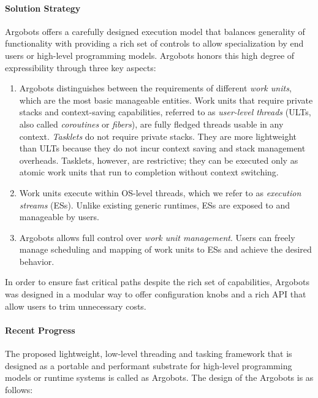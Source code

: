 \paragraph{Solution Strategy}

Argobots offers a carefully designed execution model that balances
generality of functionality with providing a rich set of controls to
allow specialization by end users or high-level programming models.
Argobots honors this high degree of expressibility through three key
aspects:

\begin{enumerate}

\item Argobots distinguishes between the requirements of different
  \emph{work units}, which are the most basic manageable
  entities. Work units that require private stacks and context-saving
  capabilities, referred to as \textit{user-level threads} (ULTs, also
  called \textit{coroutines} or \textit{fibers}), are fully fledged
  threads usable in any context.  \emph{Tasklets} do not require
  private stacks. They are more lightweight than ULTs because they do
  not incur context saving and stack management overheads.  Tasklets,
  however, are restrictive; they can be executed only as atomic work
  units that run to completion without context switching.

\item Work units execute within OS-level threads, which we refer to as
  \emph{execution streams} (ESs). Unlike existing generic runtimes,
  ESs are exposed to and manageable by users.

\item Argobots allows full control over \emph{work unit
  management}. Users can freely manage scheduling and mapping of work
  units to ESs and achieve the desired behavior.

\end{enumerate}

In order to ensure fast critical paths despite the rich set of
capabilities, Argobots was designed in a modular way to offer
configuration knobs and a rich API that allow users to trim
unnecessary costs.

\paragraph{Recent Progress}

The proposed lightweight, low-level threading and tasking framework
that is designed as a portable and performant substrate for high-level
programming models or runtime systems is called as Argobots. The
design of the Argobots is as follows:

